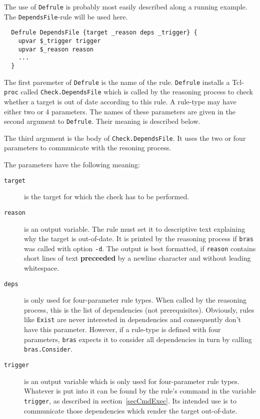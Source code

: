 \documentclass[12pt]{article}
\newcommand{\bras}{\texttt{bras}}
\begin{document}
The use of \texttt{Defrule} is probably most easily described along a
running example. The \texttt{DependsFile}-rule will be used here.
\begin{verbatim}
  Defrule DependsFile {target _reason deps _trigger} {
    upvar $_trigger trigger
    upvar $_reason reason
    ...
  }
\end{verbatim}

The first paremeter of \texttt{Defrule} is the name of the rule.
\texttt{Defrule} installs a Tcl-\texttt{proc} called
\texttt{Check.DependsFile} which is called by the reasoning process to
check whether a target is out of date according to this rule. A
rule-type may have either two or 4 parameters. The names of these
parameters are given in the second argument to \texttt{Defrule}. Their
meaning is described below.

The third argument is the body of \texttt{Check.DependsFile}. It uses
the two or four parameters to communicate with the resoning process.

The parameters have the following meaning:

\begin{description}
\item[\texttt{target}] is the target for which the check has to be
  performed.

\item[\texttt{reason}] is an output variable. The rule must set it to
  descriptive text explaining why the target is out-of-date. It is
  printed by the reasoning process if \bras{} was called with option
  \texttt{-d}. The output is best formatted, if \texttt{reason}
  contains short lines of text \textbf{preceeded} by a newline
  character and without leading whitespace.
  
\item[\texttt{deps}] is only used for four-parameter rule types. When
  called by the reasoning process, this is the list of
  dependencies (not prerequisites). Obviously, rules like
  \texttt{Exist} are never interested in dependencies and consequently
  don't have this parameter. However, if a rule-type is defined with
  four parameters, \bras{} expects it to consider all
  dependencies in turn by calling \texttt{bras.Consider}.
  
\item[\texttt{trigger}] is an output variable which is only used for
  four-parameter rule types. Whatever is put into it can be found by
  the rule's command in the variable \texttt{trigger}, as described in
  section~\ref{secCmdExec}. Its intended use is to communicate those
  dependencies which render the target out-of-date.
\end{description}
\end{document}
